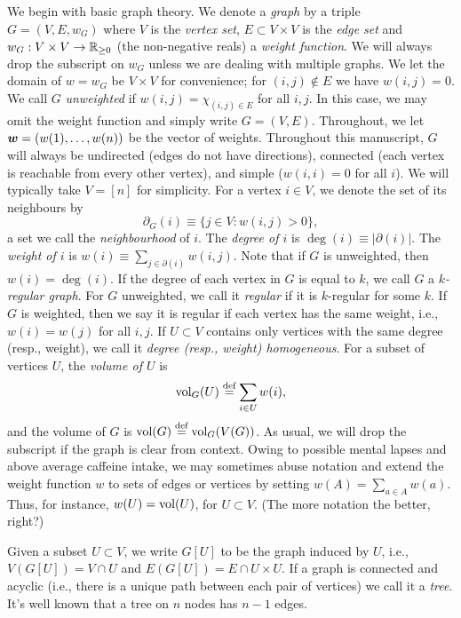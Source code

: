 We begin with basic graph theory. 
We denote a \emph{graph} by a triple $G=(V,E,w_G)$ where $V$ is the \emph{vertex set}, $E\subset V\times V$ is the \emph{edge set} and $w_G:V\times V\to\mathbb{R}_{\geq0}$ (the non-negative reals) a \emph{weight function}. We will always  drop the subscript on  $w_G$  unless we are dealing with multiple graphs.  We let the domain of $w=w_G$ be $V\times V$ for convenience; for $(i,j)\notin E$ we have $w(i,j)=0$. We call $G$ \emph{unweighted} if $w(i,j)=\chi_{(i,j)\in E}$ for all $i,j$. In this case, we may omit the weight function and simply write $G=(V,E)$. Throughout, we  let $\vb*{w}=(w(1),\dots,w(n))$  be the vector of weights.  
Throughout this manuscript, $G$ will  always be undirected 
(edges do not have  directions),  connected (each vertex is reachable from every other vertex),  and simple ($w(i,i)=0$ for all $i$). 
We will typically take $V=[n]$ for simplicity. For a  vertex $i\in V$, we denote the set of its neighbours by 
\begin{equation}
\label{eq:delta(i)}
\partial_G(i) \equiv  \{j\in V:w(i,j)>0\},
\end{equation}
a set we call the \emph{neighbourhood} of $i$. The \emph{degree of $i$} is $\deg(i)\equiv |\partial(i)|$. The \emph{weight of $i$} is $w(i)\equiv \sum_{j\in \partial(i)}w(i,j)$. Note that if $G$ is unweighted, then $w(i)=\deg(i)$. If the degree of each vertex in $G$ is equal to $k$, we call $G$ a \emph{$k$-regular graph}. For $G$ unweighted, we call it \emph{regular} if it is $k$-regular for some $k$. If $G$ is  weighted, then we say it is regular  if  each  vertex has the same weight,  i.e.,  $w(i)=w(j)$ for all  $i,j$.  If $U\subset V$ contains only vertices with the same degree (resp., weight), we call it \emph{degree (resp., weight) homogeneous}. 
For a subset of vertices $U$, the \emph{volume of $U$} is 
\begin{equation}
\label{eq:volU}
\textnormal{vol}_G(U) \overset{\text{def}}{=} \sum_{i\in U}w(i),
\end{equation}
and the volume of $G$ is $\textnormal{vol}(G) \overset{\text{def}}{=} \textnormal{vol}_G(V(G))$. As usual, we will drop the subscript if the graph is clear from context. 
Owing to possible mental lapses and above average caffeine intake, we may sometimes abuse notation and extend the weight function $w$ to sets of edges or vertices by setting $w(A)=\sum_{a\in A}w(a)$. Thus, for instance, $w(U) = \textnormal{vol}(U)$, for $U\subset V$. (The more notation the better, right?) 

Given a subset $U\subset  V$, we write $G[U]$ to be the graph induced by $U$, i.e., $V(G[U])  = V\cap U$ and  $E(G[U]) = E \cap U \times U$. If a graph is connected  and acyclic (i.e., there is a unique path between each pair of vertices) we call it a \emph{tree}. It's well known that a tree on $n$ nodes has $n-1$ edges.  

